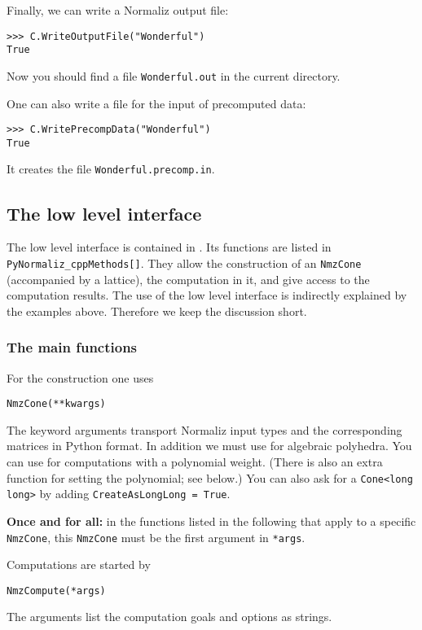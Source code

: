 \begin{small}
Finally, we can write a Normaliz output file:
\begin{Verbatim}
>>> C.WriteOutputFile("Wonderful")
True
\end{Verbatim}
Now you should find a file \verb|Wonderful.out| in the current directory.

One can also write a file for the input of precomputed data:
\begin{Verbatim}
>>> C.WritePrecompData("Wonderful")
True
\end{Verbatim}
It creates the file \verb|Wonderful.precomp.in|.

\subsection{The low level interface}

The low level interface is contained in . Its functions are listed in\\ \verb|PyNormaliz_cppMethods[]|. They allow the construction of an \verb|NmzCone| (accompanied by a lattice), the computation in it, and give access to the computation results. The use of the low level interface is indirectly explained by the examples above. Therefore we keep the discussion short.

\subsubsection{The main functions}

For the construction one uses
\begin{Verbatim}
NmzCone(**kwargs)
\end{Verbatim}
The keyword arguments  transport Normaliz input types and the corresponding matrices in Python format. In addition we must use  for algebraic polyhedra. You can use  for computations with a polynomial weight. (There is also an extra function for setting the polynomial; see below.) You can also ask for a \verb|Cone<long long>| by adding \verb|CreateAsLongLong = True|.

\textbf{Once and for all:} in the functions listed in the following that apply to a specific \verb|NmzCone|, this \verb|NmzCone| must be the first argument in \verb|*args|.

Computations are started by
\begin{Verbatim}
NmzCompute(*args)
\end{Verbatim}
The arguments list the computation goals and options as strings.


\end{small}
